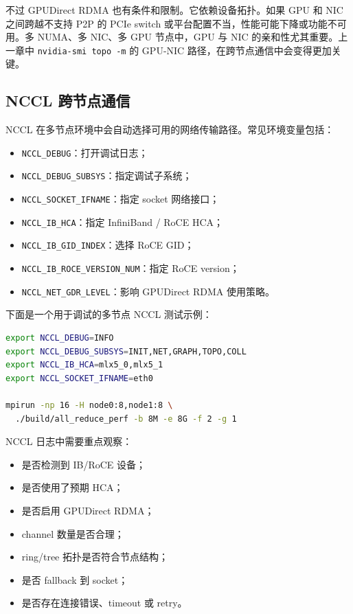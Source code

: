 不过 GPUDirect RDMA 也有条件和限制。它依赖设备拓扑。如果 GPU 和 NIC 之间跨越不支持 P2P 的 PCIe switch 或平台配置不当，性能可能下降或功能不可用。多 NUMA、多 NIC、多 GPU 节点中，GPU 与 NIC 的亲和性尤其重要。上一章中 \texttt{nvidia-smi topo -m} 的 GPU-NIC 路径，在跨节点通信中会变得更加关键。

\subsection{NCCL 跨节点通信}
\label{subsec:nccl-cross-node-communication}

NCCL 在多节点环境中会自动选择可用的网络传输路径。常见环境变量包括：

\begin{itemize}
  \item \texttt{NCCL\_DEBUG}：打开调试日志；
  \item \texttt{NCCL\_DEBUG\_SUBSYS}：指定调试子系统；
  \item \texttt{NCCL\_SOCKET\_IFNAME}：指定 socket 网络接口；
  \item \texttt{NCCL\_IB\_HCA}：指定 InfiniBand / RoCE HCA；
  \item \texttt{NCCL\_IB\_GID\_INDEX}：选择 RoCE GID；
  \item \texttt{NCCL\_IB\_ROCE\_VERSION\_NUM}：指定 RoCE version；
  \item \texttt{NCCL\_NET\_GDR\_LEVEL}：影响 GPUDirect RDMA 使用策略。
\end{itemize}

下面是一个用于调试的多节点 NCCL 测试示例：

\begin{lstlisting}[language=bash,caption={多节点 NCCL 通信调试示例},label={lst:nccl-rdma-debug}]
export NCCL_DEBUG=INFO
export NCCL_DEBUG_SUBSYS=INIT,NET,GRAPH,TOPO,COLL
export NCCL_IB_HCA=mlx5_0,mlx5_1
export NCCL_SOCKET_IFNAME=eth0

mpirun -np 16 -H node0:8,node1:8 \
  ./build/all_reduce_perf -b 8M -e 8G -f 2 -g 1
\end{lstlisting}

NCCL 日志中需要重点观察：

\begin{itemize}
  \item 是否检测到 IB/RoCE 设备；
  \item 是否使用了预期 HCA；
  \item 是否启用 GPUDirect RDMA；
  \item channel 数量是否合理；
  \item ring/tree 拓扑是否符合节点结构；
  \item 是否 fallback 到 socket；
  \item 是否存在连接错误、timeout 或 retry。
\end{itemize}

